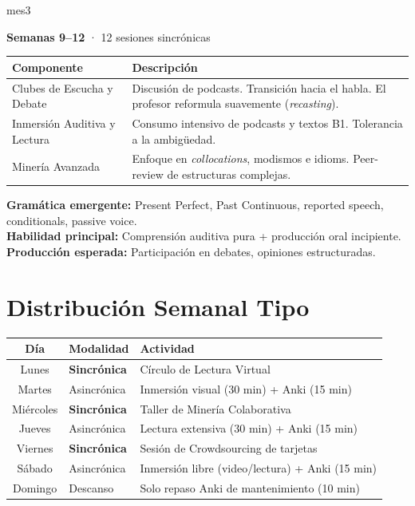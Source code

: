 \documentclass[12pt,a4paper]{article}
\begin{document}
\begin{cajames}[\textcolor{white}{Mes 3: Consolidación Auditiva y Clubes de Debate (A2 $\rightarrow$ B1)}]{mes3}

\textbf{Semanas 9--12} · 12 sesiones sincrónicas

\medskip
\begin{tabularx}{\textwidth}{@{} l X @{}}
\toprule
\textbf{Componente} & \textbf{Descripción} \\
\midrule
Clubes de Escucha y Debate & Discusión de podcasts. Transición hacia el habla. El profesor reformula suavemente (\textit{recasting}). \\[4pt]
Inmersión Auditiva y Lectura & Consumo intensivo de podcasts y textos B1. Tolerancia a la ambigüedad. \\[4pt]
Minería Avanzada & Enfoque en \textit{collocations}, modismos e idioms. Peer-review de estructuras complejas. \\
\bottomrule
\end{tabularx}

\medskip
\textbf{Gramática emergente:} Present Perfect, Past Continuous, reported speech, conditionals, passive voice.\\
\textbf{Habilidad principal:} Comprensión auditiva pura + producción oral incipiente.\\
\textbf{Producción esperada:} Participación en debates, opiniones estructuradas.
\end{cajames}

\section*{Distribución Semanal Tipo}

\begin{cajanota}
\begin{tabularx}{\textwidth}{@{} c l X @{}}
\toprule
\textbf{Día} & \textbf{Modalidad} & \textbf{Actividad} \\
\midrule
Lunes    & \textcolor{mes2}{\textbf{Sincrónica}} & Círculo de Lectura Virtual \\
Martes   & Asincrónica & Inmersión visual (30 min) + Anki (15 min) \\
Miércoles & \textcolor{mes2}{\textbf{Sincrónica}} & Taller de Minería Colaborativa \\
Jueves   & Asincrónica & Lectura extensiva (30 min) + Anki (15 min) \\
Viernes  & \textcolor{mes2}{\textbf{Sincrónica}} & Sesión de Crowdsourcing de tarjetas \\
Sábado   & Asincrónica & Inmersión libre (video/lectura) + Anki (15 min) \\
Domingo  & Descanso & Solo repaso Anki de mantenimiento (10 min) \\
\bottomrule
\end{tabularx}
\end{cajanota}
\end{document}
